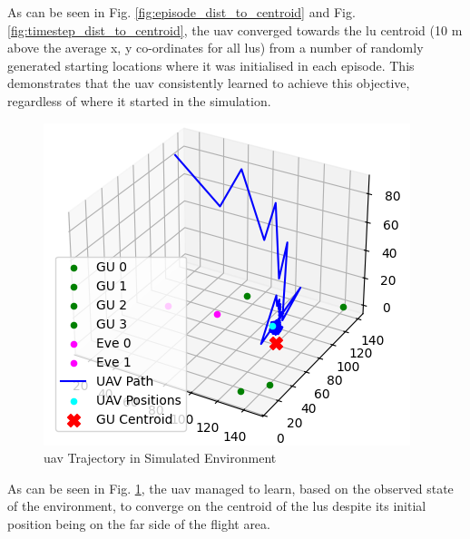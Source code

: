 As can be seen in Fig. \ref{fig:episode_dist_to_centroid} and Fig. \ref{fig:timestep_dist_to_centroid}, the \acrshort{uav} converged towards the \acrshort{lu} centroid (10 m above the average x, y co-ordinates for all \acrshort{lu}s) from a number of randomly generated starting locations where it was initialised in each episode. 
This demonstrates that the \acrshort{uav} consistently learned to achieve this objective, regardless of where it started in the simulation. 

\begin{figure} [ht!]
    \centering
    \includegraphics[width=0.75\linewidth]{figures/1_layers_uav_trajectory_20_timestep_370.png}
    \caption{\acrshort{uav} Trajectory in Simulated Environment}
    \label{fig:uav_trajectory_cube}
\end{figure}
As can be seen in Fig. \ref{fig:uav_trajectory_cube}, the \acrshort{uav} managed to learn, based on the observed state of the environment, to converge on the centroid of the \acrshort{lu}s despite its initial position being on the far side of the flight area. 
